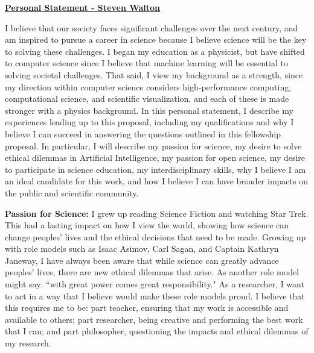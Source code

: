 \documentclass[12pt]{article}
\begin{document}
\begin{center}
\underline{\bf Personal Statement - Steven Walton}\\
\end{center}
I believe that our society faces significant challenges over the next century,
and am inspired to pursue a career in science because I believe science will
be the key to solving these challenges.
%
I began my education as a physicist, but have shifted to computer science since
I believe that machine learning will be essential to solving societal challenges.
%
That said, I view my background as a strength, 
since my direction within computer science considers high-performance computing, 
computational science, and scientific visualization, and each of these is 
made stronger with a physics background.
%
In this personal statement, I describe my experiences leading up to this proposal,
including my qualifications and why I believe I can succeed in answering the questions
outlined in this fellowship proposal.
%
In particular, I will describe my passion for science,
my desire to solve ethical dilemmas in Artificial Intelligence,
my passion for open science,
my desire to participate in science education,
my interdisciplinary skills,
why I believe I am an ideal candidate for this work,
and how I believe I can have broader impacts on the public and scientific
community.
%         
%

\textbf{Passion for Science:} I grew up reading Science Fiction and watching
Star Trek. This had a lasting impact on how I view the world, showing how
science can change peoples' lives and the ethical decisions that need to be
made. Growing up with role models such as Isaac Asimov, Carl Sagan, and Captain
Kathryn Janeway, I have always been aware that while science can greatly advance
peoples' lives, there are new ethical dilemmas that arise. As another role model
might say: ``with great power comes great responsibility." As a researcher, I
want to act in a way that I believe would make these role models proud. I
believe that this requires me to be: part teacher, ensuring that my work is
accessible and available to others; part researcher, being creative and
performing the best work that I can; and part philosopher, questioning the
impacts and ethical dilemmas of my research.
\end{document}

